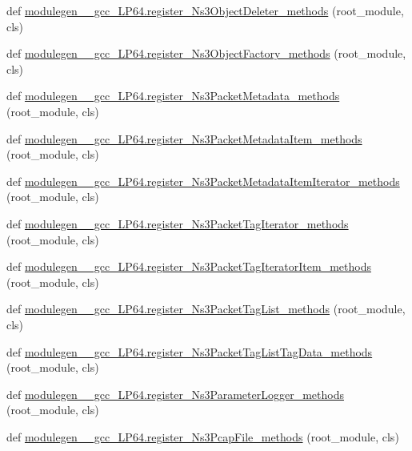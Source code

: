 \begin{DoxyCompactItemize}
\item 
def \hyperlink{namespacemodulegen____gcc__LP64_ae02c1fc1dc3e8ca9071dee347b82eae5}{modulegen\+\_\+\+\_\+gcc\+\_\+\+L\+P64.\+register\+\_\+\+Ns3\+Object\+Deleter\+\_\+methods} (root\+\_\+module, cls)
\item 
def \hyperlink{namespacemodulegen____gcc__LP64_a786202f6865813272a2645524e567a31}{modulegen\+\_\+\+\_\+gcc\+\_\+\+L\+P64.\+register\+\_\+\+Ns3\+Object\+Factory\+\_\+methods} (root\+\_\+module, cls)
\item 
def \hyperlink{namespacemodulegen____gcc__LP64_a1389373aaae60b11eca14fb1daaa350f}{modulegen\+\_\+\+\_\+gcc\+\_\+\+L\+P64.\+register\+\_\+\+Ns3\+Packet\+Metadata\+\_\+methods} (root\+\_\+module, cls)
\item 
def \hyperlink{namespacemodulegen____gcc__LP64_a2ac7c9819f0a71366e0cb996f16c2232}{modulegen\+\_\+\+\_\+gcc\+\_\+\+L\+P64.\+register\+\_\+\+Ns3\+Packet\+Metadata\+Item\+\_\+methods} (root\+\_\+module, cls)
\item 
def \hyperlink{namespacemodulegen____gcc__LP64_ad75a5ba1c89bf75f399491ebc4bc2299}{modulegen\+\_\+\+\_\+gcc\+\_\+\+L\+P64.\+register\+\_\+\+Ns3\+Packet\+Metadata\+Item\+Iterator\+\_\+methods} (root\+\_\+module, cls)
\item 
def \hyperlink{namespacemodulegen____gcc__LP64_a1d07a5663a331363a6765890f7c3f7ad}{modulegen\+\_\+\+\_\+gcc\+\_\+\+L\+P64.\+register\+\_\+\+Ns3\+Packet\+Tag\+Iterator\+\_\+methods} (root\+\_\+module, cls)
\item 
def \hyperlink{namespacemodulegen____gcc__LP64_af0346c019adfcbf415a97ec6cff465e1}{modulegen\+\_\+\+\_\+gcc\+\_\+\+L\+P64.\+register\+\_\+\+Ns3\+Packet\+Tag\+Iterator\+Item\+\_\+methods} (root\+\_\+module, cls)
\item 
def \hyperlink{namespacemodulegen____gcc__LP64_a96f93e9ac4cca72d9c82bad3ed221800}{modulegen\+\_\+\+\_\+gcc\+\_\+\+L\+P64.\+register\+\_\+\+Ns3\+Packet\+Tag\+List\+\_\+methods} (root\+\_\+module, cls)
\item 
def \hyperlink{namespacemodulegen____gcc__LP64_a5297a25e4d02fb34208dfd16709b500f}{modulegen\+\_\+\+\_\+gcc\+\_\+\+L\+P64.\+register\+\_\+\+Ns3\+Packet\+Tag\+List\+Tag\+Data\+\_\+methods} (root\+\_\+module, cls)
\item 
def \hyperlink{namespacemodulegen____gcc__LP64_a9c97a32cb07711332a262d82c8dad27a}{modulegen\+\_\+\+\_\+gcc\+\_\+\+L\+P64.\+register\+\_\+\+Ns3\+Parameter\+Logger\+\_\+methods} (root\+\_\+module, cls)
\item 
def \hyperlink{namespacemodulegen____gcc__LP64_ab491f7fd4edd40dff0ee1ef02dba0c2b}{modulegen\+\_\+\+\_\+gcc\+\_\+\+L\+P64.\+register\+\_\+\+Ns3\+Pcap\+File\+\_\+methods} (root\+\_\+module, cls)

\end{DoxyCompactItemize}

